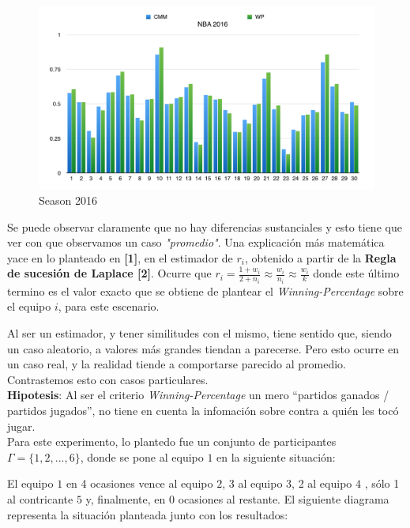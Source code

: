 \begin{figure}[h!]
  \begin{center}
	\includegraphics[scale=0.40]{imagenes/cualitative/comparative/nba2016.png}
	\caption{Season 2016}
  \end{center}
\end{figure}

Se puede observar claramente que no hay diferencias sustanciales y esto tiene que ver con que observamos un caso \textit{"promedio"}. Una explicaci\'on m\'as matem\'atica yace en lo planteado en \textbf{[1]}, en el estimador de $r_{i}$, obtenido a partir de la \textbf{Regla de sucesi\'on de Laplace [2]}. Ocurre que $r_{i} = \frac{1 + w_{i}}{2 + n_{i}} \approx \frac{w_{i}}{n_{i}} \approx \frac{w_{i}}{k}$ donde este \'ultimo termino es el valor exacto que se obtiene de plantear el \textit{Winning-Percentage} sobre el equipo $i$, para este escenario.

Al ser un estimador, y tener similitudes con el mismo, tiene sentido que, siendo un caso aleatorio, a valores m\'as grandes tiendan a parecerse. Pero esto ocurre en un caso real, y la realidad tiende a comportarse parecido al promedio. Contrastemos esto con casos particulares. \\

\textbf{Hipotesis}: Al ser el criterio \textit{Winning-Percentage} un mero ``partidos ganados / partidos jugados'', no tiene en cuenta la infomaci\'on sobre contra a qui\'en les toc\'o jugar. \\

Para este experimento, lo plantedo fue un conjunto de participantes $\Gamma = \{1,2,...,6\}$, donde se pone al equipo $1$ en la siguiente situaci\'on:

El equipo $1$ en 4 ocasiones vence al equipo $2$, 3 al equipo $3$, 2 al equipo $4$ , s\'olo 1 al contricante $5$ y, finalmente, en 0 ocasiones al restante. El siguiente diagrama representa la situaci\'on planteada junto con los resultados:

